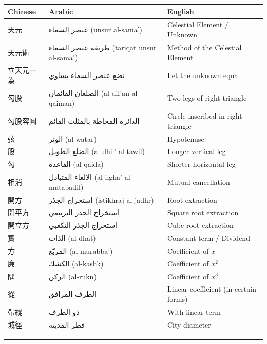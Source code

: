 \documentclass[11pt,a4paper]{article}
\newcommand{\ar}[1]{\arabicfont\beginR #1\endR}
\begin{document}
\vspace{0.3cm}

\begin{center}
\begin{tabular}{lll}
\toprule
\textbf{Chinese} & \textbf{Arabic} & \textbf{English} \\
\midrule
天元 & \ar{عنصر السماء} (unsur al-sama') & Celestial Element / Unknown \\
天元術 & \ar{طريقة عنصر السماء} (tariqat unsur al-sama') & Method of the Celestial Element \\
立天元一為 & \ar{نضع عنصر السماء يساوي} & Let the unknown equal \\
勾股 & \ar{الضلعان القائمان} (al-dil'an al-qaiman) & Two legs of right triangle \\
勾股容圓 & \ar{الدائرة المحاطة بالمثلث القائم} & Circle inscribed in right triangle \\
弦 & \ar{الوتر} (al-watar) & Hypotenuse \\
股 & \ar{الضلع الطويل} (al-dhil' al-tawil) & Longer vertical leg \\
勾 & \ar{القاعدة} (al-qaida) & Shorter horizontal leg \\
相消 & \ar{الإلغاء المتبادل} (al-ilgha' al-mutabadil) & Mutual cancellation \\
開方 & \ar{استخراج الجذر} (istikhraj al-jadhr) & Root extraction \\
開平方 & \ar{استخراج الجذر التربيعي} & Square root extraction \\
開立方 & \ar{استخراج الجذر التكعبي} & Cube root extraction \\
實 & \ar{الذات} (al-dhat) & Constant term / Dividend \\
方 & \ar{المربّع} (al-murabba') & Coefficient of $x$ \\
廉 & \ar{الكشك} (al-kashk) & Coefficient of $x^2$ \\
隅 & \ar{الركن} (al-rukn) & Coefficient of $x^3$ \\
從 & \ar{الطرف المرافق} & Linear coefficient (in certain forms) \\
帶縱 & \ar{ذو الطرف} & With linear term \\
城徑 & \ar{قطر المدينة} & City diameter \\
\bottomrule
\end{tabular}
\end{center}

\vspace{0.5cm}

\noindent\textcolor{rulecolor}{\rule{\textwidth}{0.4pt}}
\end{document}
